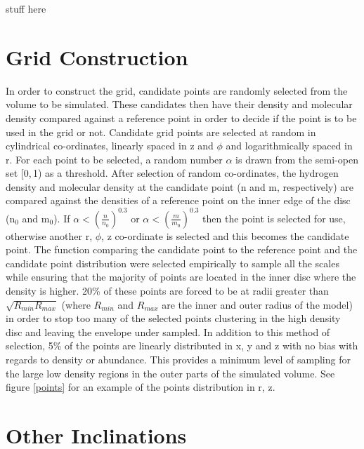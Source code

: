\documentclass[useAMS,usenatbib]{mn2e}
\begin{document}
stuff here
\newpage

\appendix

\section{Grid Construction} \label{sec:gridding} 

In order to construct the grid, candidate points are randomly selected from the volume to be simulated. These candidates then have their density and molecular density compared against a reference point in order to decide if the point is to be used in the grid or not. Candidate grid points are selected at random in cylindrical co-ordinates, linearly spaced in z and $\phi$ and logarithmically spaced in r. For each point to be selected, a random number $\alpha$ is drawn from the semi-open set [0,$\,$1) as a threshold. After selection of random co-ordinates, the hydrogen density and molecular density at the candidate point (n and m, respectively) are compared against the densities of a reference point on the inner edge of the disc (n$_0$ and m$_0$). If $\alpha<\left( \frac{n}{n_0} \right)^{0.3}$ or $\alpha< \left( \frac{m}{m_0} \right)^{0.3}$ then the point is selected for use, otherwise another r, $\phi$, z co-ordinate is selected and this becomes the candidate point. The function comparing the candidate point to the reference point and the candidate point distribution were selected empirically to sample all the scales while ensuring that the majority of points are located in the inner disc where the density is higher. 20\% of these points are forced to be at radii greater than $\sqrt{R_{min}R_{max}}$ (where $R_{min}$ and $R_{max}$ are the inner and outer radius of the model) in order to stop too many of the selected points clustering in the high density disc and leaving the envelope under sampled. In addition to this method of selection, 5\% of the points are linearly distributed in x, y and z with no bias with regards to density or abundance. This provides a minimum level of sampling for the large low density regions in the outer parts of the simulated volume. See figure \ref{points} for an example of the points distribution in r, z. \newline


\section{Other Inclinations} \label{sec:other_inc}
\end{document}
